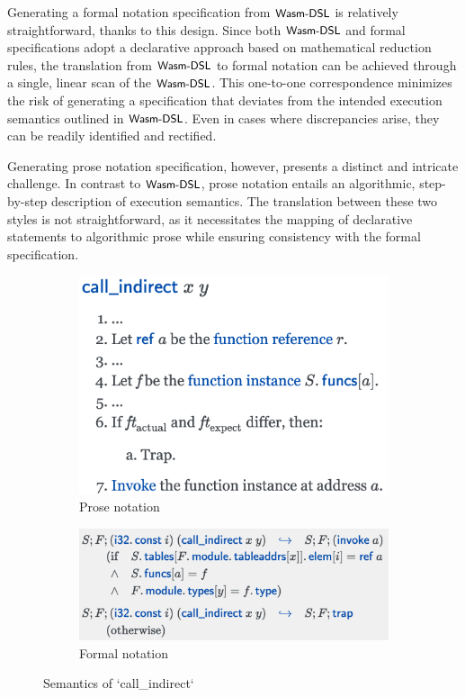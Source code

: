 Generating a formal notation specification from $\textsf{\small Wasm-DSL}$ is relatively
straightforward, thanks to this design. Since both $\textsf{\small Wasm-DSL}$ and formal
specifications adopt a declarative approach based on mathematical reduction
rules, the translation from $\textsf{\small Wasm-DSL}$ to formal notation can be achieved through a
single, linear scan of the $\textsf{\small Wasm-DSL}$. This one-to-one correspondence minimizes the
risk of generating a specification that deviates from the intended execution
semantics outlined in $\textsf{\small Wasm-DSL}$. Even in cases where discrepancies arise, they can
be readily identified and rectified.

Generating prose notation specification, however, presents a distinct and
intricate challenge. In contrast to $\textsf{\small Wasm-DSL}$, prose notation entails an
algorithmic, step-by-step description of execution semantics. The translation
between these two styles is not straightforward, as it necessitates the mapping
of declarative statements to algorithmic prose while ensuring consistency with
the formal specification.

\begin{figure}
  \centering
  \begin{subfigure}[b]{0.45\textwidth}
    \includegraphics[width=\textwidth]{img/prosespec2}
    \caption{Prose notation}
    \label{fig:prosespec2}
  \end{subfigure}
  \hfill
  \begin{subfigure}[b]{0.45\textwidth}
    \includegraphics[width=\textwidth]{img/formalspec2}
    \caption{Formal notation}
    \label{fig:formalspec2}
  \end{subfigure}

  \caption{Semantics of `call\_indirect`}
  \label{fig:spec2}
\end{figure}

